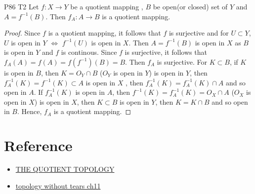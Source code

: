 \begin{exercise}{P86 T2}{}
    Let $f:X\rightarrow Y$ be a quotient mapping , $B$ be open(or closed) set of $Y$
    and $A=f^{-1}(B)$. Then $f_A:A\rightarrow B$ is a quotient mapping.
\end{exercise}

\begin{proof}
    Since $f$ is a quotient mapping, it follows that $f$ is surjective and for $U\subset Y$, $U$ is open in $Y$ $\Leftrightarrow$ $f^{-1}(U)$ is open in $X$.
    Then $A=f^{-1}(B)$ is open in $X$ as $B$ is open in $Y$ and $f$ is continous.
    Since $f$ is surjective, it follows that $f_A(A)=f(A)=f(f^{-1})(B)=B$. Then $f_A$ is surjective.
    For $K\subset B$, if $K$ is open in $B$, then $K=O_Y\cap B$ ($O_Y$ is open in $Y$) is open in $Y$, then $f_A^{-1}(K)=f^{-1}(K)\subset A$ is open in $X$ , then $f_A^{-1}(K)=f_A^{-1}(K)\cap A$ and so open in $A$.
    If $f_A^{-1}(K)$ is open in $A$, then $f^{-1}(K)=f_A^{-1}(K)=O_X\cap A$ ($O_X$ is open in $X$) is open in $X$, then $K\subset B$ is open in $Y$, then $K=K\cap B$ and so open in $B$. 
    Hence, $f_A$ is a quotient mapping.
\end{proof}

\section{Reference}

\begin{itemize}
    \item \href{http://staff.ustc.edu.cn/~wangzuoq/Courses/21S-Topology/Notes/Lec06.pdf}{THE QUOTIENT TOPOLOGY}
    \item \href{}{topology without tears ch11}
\end{itemize}

